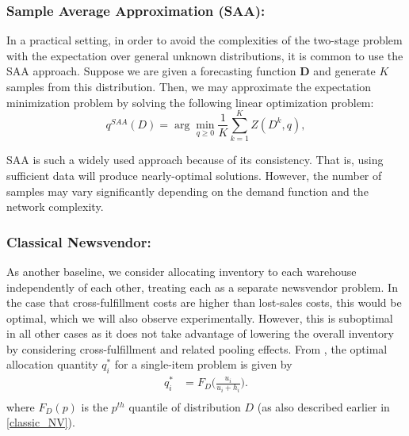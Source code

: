 \documentclass[poms,final,blindrev]{poms1_V1} %
\begin{document}
\subsubsection*{Sample Average Approximation (SAA):} In a practical setting, in order to avoid the complexities of the two-stage problem with the expectation over general unknown distributions, it is common to use the SAA approach.
Suppose we are given a forecasting function $\boldsymbol{D}$ and generate $K$ samples from this distribution. Then, we may approximate the expectation minimization problem by solving the following linear optimization problem:
\begin{equation}
\label{SAA_method}
{q}^{SAA}({D}) = \arg \min_{q \geq 0} \frac{1}{K} \sum_{k=1}^{K} Z({D}^k, {q}),
\end{equation}

SAA is such a widely used approach because of its consistency. That is, using sufficient data will produce nearly-optimal solutions.  However, the number of samples may vary significantly depending on the demand function and the network complexity.


\subsubsection*{Classical Newsvendor:} As another baseline, we consider allocating inventory to each warehouse independently of each other, treating each as a separate newsvendor problem. In the case that cross-fulfillment costs are higher than lost-sales costs, this would be optimal, which we will also observe experimentally. However, this is suboptimal in all other cases as it does not take advantage of lowering the overall inventory by considering cross-fulfillment and related pooling effects.
From \cite{arrow1951optimal}, the optimal allocation quantity $q_i^*$ for a single-item problem is given by 
\begin{equation}
\begin{aligned}
q^*_i &=  F_{D} \Big( \frac{u_i }{ u_i+ h_i  }\Big).\\
\end{aligned}
\end{equation} 
where $F_{D}(p)$ is the $p^{th}$ quantile of distribution $D$ (as also described earlier in \eqref{classic_NV}).
\end{document}
